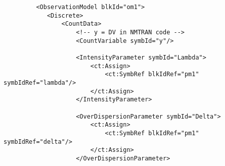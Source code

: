 \lstset{language=XML}
\begin{lstlisting}
         <ObservationModel blkId="om1">
            <Discrete>
                <CountData>
                    <!-- y = DV in NMTRAN code -->
                    <CountVariable symbId="y"/>
                    
                    <IntensityParameter symbId="Lambda">
                        <ct:Assign>
                            <ct:SymbRef blkIdRef="pm1" symbIdRef="lambda"/>
                        </ct:Assign>
                    </IntensityParameter>
                    
                    <OverDispersionParameter symbId="Delta">
                        <ct:Assign>
                            <ct:SymbRef blkIdRef="pm1" symbIdRef="delta"/>
                        </ct:Assign>
                    </OverDispersionParameter>
                    

\end{lstlisting}
